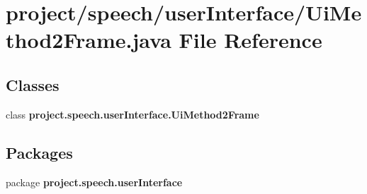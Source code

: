\section{project/speech/user\+Interface/\+Ui\+Method2\+Frame.java File Reference}
\label{_ui_method2_frame_8java}
\subsection*{Classes}
\begin{DoxyCompactItemize}
\item 
class {\bf project.\+speech.\+user\+Interface.\+Ui\+Method2\+Frame}
\end{DoxyCompactItemize}
\subsection*{Packages}
\begin{DoxyCompactItemize}
\item 
package {\bf project.\+speech.\+user\+Interface}
\end{DoxyCompactItemize}
